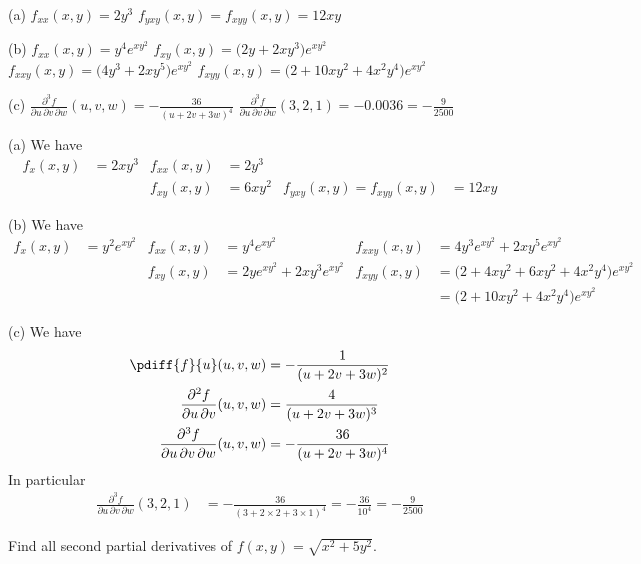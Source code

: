 \begin{answer}
(a) $f_{xx}(x,y) = 2y^3$\qquad
    $f_{yxy}(x,y) = f_{xyy}(x,y) = 12xy$

(b) $f_{xx}(x,y)= y^4e^{xy^2}$\quad
    $f_{xy}(x,y)= \big(2y+2xy^3\big)e^{xy^2}$\quad
    $f_{xxy}(x,y)= \big(4y^3 + 2xy^5\big)e^{xy^2}$\quad
    $f_{xyy}(x,y) = \big(2+10xy^2+4x^2y^4\big)e^{xy^2}$

(c) $\displaystyle\frac{\partial^3 f}{\partial u\,\partial v\,\partial w}(u,v,w)
        = -\frac{36}{(u+2v+3w)^4}$\qquad
    $\displaystyle\frac{\partial^3 f}{\partial u\,\partial v\,\partial w}(3,2,1)
         = -0.0036
         = -\frac{9}{2500}$

\end{answer}

\begin{solution}
(a) We have
\begin{align*}
f_x(x,y) &= 2xy^3 &
f_{xx}(x,y) &= 2y^3 \\
 & &
f_{xy}(x,y) &= 6xy^2 &
f_{yxy}(x,y) = f_{xyy}(x,y) &= 12xy
\end{align*}

(b) We have
\begin{align*}
f_x(x,y) &= y^2e^{xy^2} &
f_{xx}(x,y) &= y^4e^{xy^2} &
f_{xxy}(x,y) &= 4y^3e^{xy^2} + 2xy^5e^{xy^2}
\\
 & &
f_{xy}(x,y) &= 2ye^{xy^2}+2xy^3e^{xy^2} &
f_{xyy}(x,y) &= \big(2+4xy^2+6xy^2+4x^2y^4\big)e^{xy^2}\\
 & &
 & &
 &= \big(2+10xy^2+4x^2y^4\big)e^{xy^2}
\end{align*}

(c) We have
\begin{align*}
\pdiff{f}{u}(u,v,w) &= -\frac{1}{(u+2v+3w)^2} \\
\frac{\partial^2 f}{\partial u\,\partial v}(u,v,w) &= \frac{4}{(u+2v+3w)^3} \\
\frac{\partial^3 f}{\partial u\,\partial v\,\partial w}(u,v,w)
        &= -\frac{36}{(u+2v+3w)^4} 
\end{align*}
In particular
\begin{align*}
\frac{\partial^3 f}{\partial u\,\partial v\,\partial w}(3,2,1)
        &= -\frac{36}{(3+2\times 2+3\times 1)^4} 
         = -\frac{36}{10^4}
         = -\frac{9}{2500}
\end{align*}

\end{solution}


\begin{question}
Find all second partial derivatives of $f(x,y)=\sqrt{x^2+5y^2}$.
\end{question}

